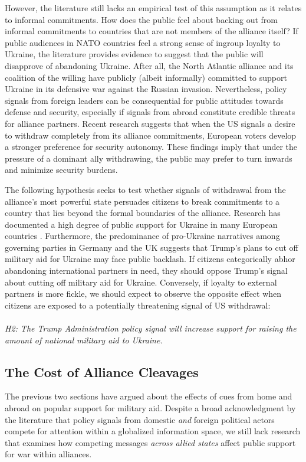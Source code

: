 However, the literature still lacks an empirical test of this assumption as it relates to informal commitments. How does the public feel about backing out from informal commitments to countries that are not members of the alliance itself? If public audiences in NATO countries feel a strong sense of ingroup loyalty to Ukraine, the literature provides evidence to suggest that the public will disapprove of abandoning Ukraine. After all, the North Atlantic alliance and its coalition of the willing have publicly (albeit informally) committed to support Ukraine in its defensive war against the Russian invasion. Nevertheless, policy signals from foreign leaders can be consequential for public attitudes towards defense and security, especially if signals from abroad constitute credible threats for alliance partners.\autocite{blankenship_price_2021, blankenship_threats_2024} Recent research suggests that when the US signals a desire to withdraw completely from its alliance commitments, European voters develop a stronger preference for security autonomy. \autocite{jakobbarrett_how_2026} These findings imply that under the pressure of a dominant ally withdrawing, the public may prefer to turn inwards and minimize security burdens. 

The following hypothesis seeks to test whether signals of withdrawal from the alliance's most powerful state persuades citizens to break commitments to a country that lies beyond the formal boundaries of the alliance. Research has documented a high degree of public support for Ukraine in many European countries \autocite{thomson_european_2023, mader_increased_2024}. Furthermore, the predominance of pro-Ukraine narratives among governing parties in Germany and the UK suggests that Trump's plans to cut off military aid for Ukraine may face public backlash. If citizens categorically abhor abandoning international partners in need, they should oppose Trump's signal about cutting off military aid for Ukraine. Conversely, if loyalty to external partners is more fickle, we should expect to observe the opposite effect when citizens are exposed to a potentially threatening signal of US withdrawal:
\paragraph{}
\textit{H2: The Trump Administration policy signal will increase support for raising the amount of national military aid to Ukraine.}

\subsection{The Cost of Alliance Cleavages}
The previous two sections have argued about the effects of cues from home and abroad on popular support for military aid. Despite a broad acknowledgment by the literature that policy signals from domestic \emph{and} foreign political actors compete for attention within a globalized information space, we still lack research that examines how competing messages \emph{across allied states} affect public support for war within alliances. 


